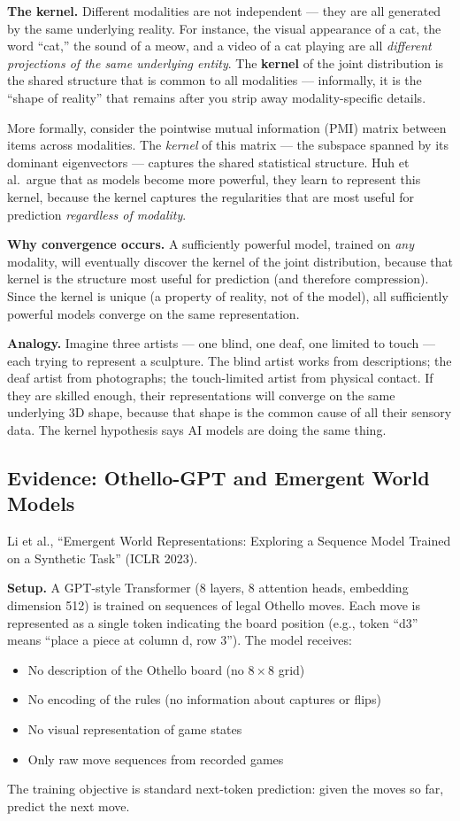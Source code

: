 \documentclass[11pt, a4paper]{article}
\begin{document}
\textbf{The kernel.} Different modalities are not independent --- they are
all generated by the same underlying reality. For instance, the visual
appearance of a cat, the word ``cat,'' the sound of a meow, and a video
of a cat playing are all \emph{different projections of the same
underlying entity}. The \textbf{kernel} of the joint distribution is the
shared structure that is common to all modalities --- informally, it is
the ``shape of reality'' that remains after you strip away
modality-specific details.

More formally, consider the pointwise mutual information (PMI) matrix
between items across modalities. The \emph{kernel} of this matrix ---
the subspace spanned by its dominant eigenvectors --- captures the shared
statistical structure. Huh et al.\ argue that as models become more
powerful, they learn to represent this kernel, because the kernel captures
the regularities that are most useful for prediction \emph{regardless of
modality}.

\textbf{Why convergence occurs.} A sufficiently powerful model, trained
on \emph{any} modality, will eventually discover the kernel of the joint
distribution, because that kernel is the structure most useful for
prediction (and therefore compression). Since the kernel is unique (a
property of reality, not of the model), all sufficiently powerful models
converge on the same representation.

\textbf{Analogy.} Imagine three artists --- one blind, one deaf, one
limited to touch --- each trying to represent a sculpture. The blind
artist works from descriptions; the deaf artist from photographs; the
touch-limited artist from physical contact. If they are skilled enough,
their representations will converge on the same underlying 3D shape,
because that shape is the common cause of all their sensory data. The
kernel hypothesis says AI models are doing the same thing.


\subsection{Evidence: Othello-GPT and Emergent World Models}

Li et al., ``Emergent World Representations: Exploring a Sequence Model
Trained on a Synthetic Task'' (ICLR 2023).

\textbf{Setup.} A GPT-style Transformer (8 layers, 8 attention heads,
embedding dimension 512) is trained on sequences of legal Othello moves.
Each move is represented as a single token indicating the board position
(e.g., token ``d3'' means ``place a piece at column d, row 3''). The
model receives:
\begin{itemize}[leftmargin=2em]
  \item No description of the Othello board (no $8 \times 8$ grid)
  \item No encoding of the rules (no information about captures or flips)
  \item No visual representation of game states
  \item Only raw move sequences from recorded games
\end{itemize}
The training objective is standard next-token prediction: given the moves
so far, predict the next move.
\end{document}
